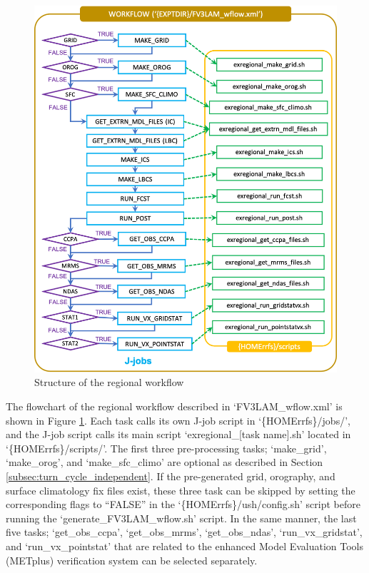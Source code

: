 \documentclass[11pt,fleqn]{report}              %
\begin{document}
\begin{figure}[ht!]
  \centering
  \includegraphics[width=0.7\linewidth]{FV3LAM_wflow_flowchart.png}
  \caption{Structure of the regional workflow}
  \label{fig:workflow_chart}
\end{figure}

The flowchart of the regional workflow described in `FV3LAM\_wflow.xml' is shown in Figure \ref{fig:workflow_chart}. Each task calls its own J-job script in `\{HOMErrfs\}/jobs/', and the J-job script calls its main script `exregional\_[task name].sh' located in `\{HOMErrfs\}/scripts/'. The first three pre-processing tasks; `make\_grid', `make\_orog', and `make\_sfc\_climo' are optional as described in Section \ref{subsec:turn_cycle_independent}. If the pre-generated grid, orography, and surface climatology fix files exist, these three task can be skipped by setting the corresponding flags to ``FALSE'' in the `\{HOMErrfs\}/ush/config.sh' script before running the `generate\_FV3LAM\_wflow.sh' script. In the same manner, the last five tasks; `get\_obs\_ccpa', `get\_obs\_mrms', `get\_obs\_ndas', `run\_vx\_gridstat', and `run\_vx\_pointstat' that are related to the enhanced Model Evaluation Tools (METplus) verification system can be selected separately. 
\end{document}
